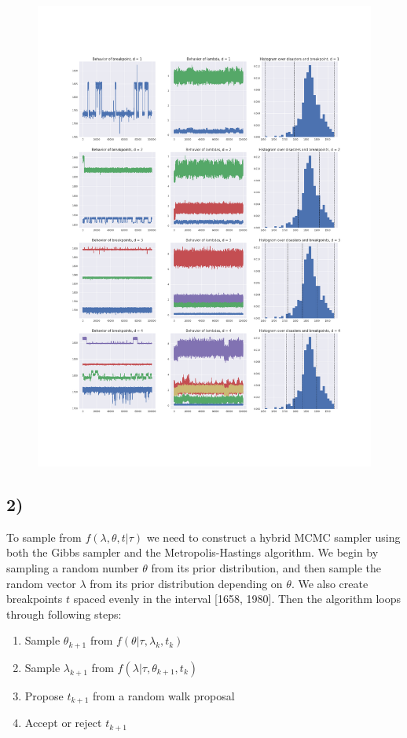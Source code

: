 \documentclass[a4paper]{article}
\begin{document}
\begin{figure}[H]
    \centering
    \includegraphics[width = 1.0\textwidth]{images/chain_behavior.png} 
    \caption{}
    \label{}
\end{figure}

\subsection*{2)}

To sample from $f(\lambda, \theta, t | \tau)$ we need to construct a hybrid MCMC sampler using both the Gibbs sampler and the Metropolis-Hastings algorithm. We begin by sampling a random number $\theta$ from its prior distribution, and then sample the random vector \textbf{$\lambda$} from its prior distribution depending on $\theta$. We also create breakpoints $t$ spaced evenly in the interval [1658, 1980]. Then the algorithm loops through following steps:
\begin{enumerate}
    \item Sample $\theta_{k+1}$ from $f(\theta|\tau, \lambda_k, t_k)$
    \item Sample $\lambda_{k+1}$ from $f(\lambda|\tau, \theta_{k+1}, t_k)$
    \item Propose $t_{k+1}$ from a random walk proposal
    \item Accept or reject $t_{k+1}$
\end{enumerate}
\end{document}

